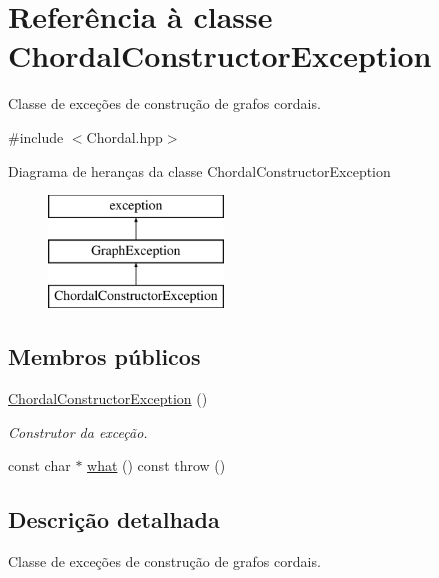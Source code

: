 \hypertarget{classChordalConstructorException}{}\section{Referência à classe Chordal\+Constructor\+Exception}
\label{classChordalConstructorException}


Classe de exceções de construção de grafos cordais.  




{\ttfamily \#include $<$Chordal.\+hpp$>$}

Diagrama de heranças da classe Chordal\+Constructor\+Exception\begin{figure}[H]
\begin{center}
\leavevmode
\includegraphics[height=3.000000cm]{classChordalConstructorException}
\end{center}
\end{figure}
\subsection*{Membros públicos}
\begin{DoxyCompactItemize}
\item 
\mbox{\label{classChordalConstructorException_a7b884c1b0146128227fc27162f2820c5}} 
\hyperlink{classChordalConstructorException_a7b884c1b0146128227fc27162f2820c5}{Chordal\+Constructor\+Exception} ()
\begin{DoxyCompactList}\small\item\em Construtor da exceção. \end{DoxyCompactList}\item 
const char $\ast$ \hyperlink{classChordalConstructorException_af45168f68f01e0b7cd98d8e82306a49b}{what} () const  throw ()
\end{DoxyCompactItemize}


\subsection{Descrição detalhada}
Classe de exceções de construção de grafos cordais. 

